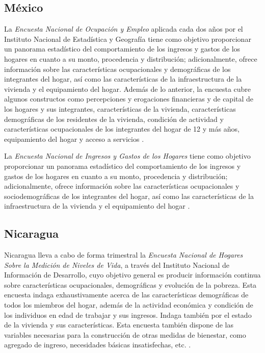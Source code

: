 \documentclass[12pt,spanish,]{book}
\begin{document}
\hypertarget{mexico}{%
\subsection*{México}\label{mexico}}

La \emph{Encuesta Nacional de Ocupación y Empleo} aplicada cada dos años por el Instituto Nacional de Estadística y Geografía tiene como objetivo proporcionar un panorama estadístico del comportamiento de los ingresos y gastos de los hogares en cuanto a su monto, procedencia y distribución; adicionalmente, ofrece información sobre las características ocupacionales y demográficas de los integrantes del hogar, así como las características de la infraestructura de la vivienda y el equipamiento del hogar. Además de lo anterior, la encuesta cubre algunos constructos como percepciones y erogaciones financieras y de capital de los hogares y sus integrantes, características de la vivienda, características demográficas de los residentes de la vivienda, condición de actividad y características ocupacionales de los integrantes del hogar de 12 y más años, equipamiento del hogar y acceso a servicios \autocite{INEGI-MX}.

La \emph{Encuesta Nacional de Ingresos y Gastos de los Hogares} tiene como objetivo proporcionar un panorama estadístico del comportamiento de los ingresos y gastos de los hogares en cuanto a su monto, procedencia y distribución; adicionalmente, ofrece información sobre las características ocupacionales y sociodemográficas de los integrantes del hogar, así como las características de la infraestructura de la vivienda y el equipamiento del hogar \autocite{INEGI2-MX}.

\hypertarget{nicaragua}{%
\subsection*{Nicaragua}\label{nicaragua}}

Nicaragua lleva a cabo de forma trimestral la \emph{Encuesta Nacional de Hogares Sobre la Medición de Niveles de Vida}, a través del Instituto Nacional de Información de Desarrollo, cuyo objetivo general es producir información continua sobre características ocupacionales, demográficas y evolución de la pobreza. Esta encuesta indaga exhaustivamente acerca de las características demográficas de todos los miembros del hogar, además de la actividad económica y condición de los individuos en edad de trabajar y sus ingresos. Indaga también por el estado de la vivienda y sus características. Esta encuesta también dispone de las variables necesarias para la construcción de otras medidas de bienestar, como agregado de ingreso, necesidades básicas insatisfechas, etc. \autocite{INIDE-NI}.
\end{document}
